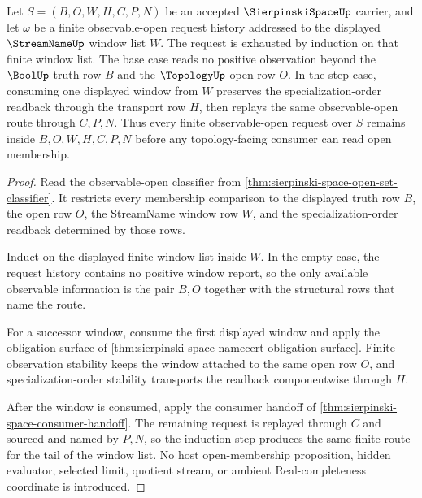 \begin{theorem}
\label{thm:sierpinski-space-observable-open-induction}
Let $S=(B,O,W,H,C,P,N)$ be an accepted $\SierpinskiSpaceUp$ carrier, and let $\omega$ be a finite observable-open request history addressed to the displayed $\StreamNameUp$ window list $W$. The request is exhausted by induction on that finite window list. The base case reads no positive observation beyond the $\BoolUp$ truth row $B$ and the $\TopologyUp$ open row $O$. In the step case, consuming one displayed window from $W$ preserves the specialization-order readback through the transport row $H$, then replays the same observable-open route through $C,P,N$. Thus every finite observable-open request over $S$ remains inside $B,O,W,H,C,P,N$ before any topology-facing consumer can read open membership.
\end{theorem}
\begin{proof}
Read the observable-open classifier from \autoref{thm:sierpinski-space-open-set-classifier}. It restricts every membership comparison to the displayed truth row $B$, the open row $O$, the StreamName window row $W$, and the specialization-order readback determined by those rows.

Induct on the displayed finite window list inside $W$. In the empty case, the request history contains no positive window report, so the only available observable information is the pair $B,O$ together with the structural rows that name the route.

For a successor window, consume the first displayed window and apply the obligation surface of \autoref{thm:sierpinski-space-namecert-obligation-surface}. Finite-observation stability keeps the window attached to the same open row $O$, and specialization-order stability transports the readback componentwise through $H$.

After the window is consumed, apply the consumer handoff of \autoref{thm:sierpinski-space-consumer-handoff}. The remaining request is replayed through $C$ and sourced and named by $P,N$, so the induction step produces the same finite route for the tail of the window list. No host open-membership proposition, hidden evaluator, selected limit, quotient stream, or ambient Real-completeness coordinate is introduced.
\end{proof}

